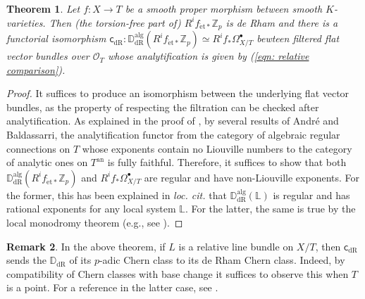 \documentclass[11pt, letterpaper]{amsart}
\theoremstyle{plain}
\newtheorem{theorem}{Theorem}[section]
\theoremstyle{definition}
\newtheorem{remark}[theorem]{Remark}
\newcommand{\ID}{\mathbb{D}}
\newcommand{\IL}{\mathbb{L}}
\newcommand{\IZ}{\mathbb{Z}}
\newcommand{\<}{\langle}
\renewcommand{\>}{\rangle}
\newcommand{\sO}{\mathcal{O}}
\newcommand{\et}{\mathrm{{\acute{e}}t}}
\newcommand{\dR}{\mathrm{dR}}
\begin{document}
\begin{theorem}
\label{thm: alg. compare}
    Let $f : X \to T$ be a smooth proper morphism between smooth $K$-varieties. Then (the torsion-free part of) $R^i f_{\et *} \IZ_p$ is de Rham and there is a functorial isomorphism $\mathsf{c}_\dR : \ID_\dR^{\mathrm{alg}}(R^i f_{\et *} \IZ_p) \simeq R^i f_* \Omega_{X/T}^\bullet$ bewteen filtered flat vector bundles over $\sO_T$ whose analytification is given by (\ref{eqn: relative comparison}).  
\end{theorem}
\begin{proof}
It suffices to produce an isomorphism between the underlying flat vector bundles, as the property of respecting the filtration can be checked after analytification. 
As explained in the proof of \cite[Lem.~4.1.2]{DLLZ}, by several results of Andr\'e and Baldassarri, the analytification functor from the category of algebraic regular connections on $T$ whose exponents contain no Liouville numbers to the category of analytic ones on $T^{\mathrm{an}}$ is fully faithful. Therefore, it suffices to show that both $\ID_\dR^{\mathrm{alg}}(R^i f_{\et *} \IZ_p)$ and $R^i f_* \Omega_{X/T}^\bullet$ are regular and have non-Liouville exponents. 
For the former, this has been explained in \textit{loc. cit.} that $\ID_\dR^{\mathrm{alg}}(\IL)$ is regular and has rational exponents for any local system $\IL$. 
For the latter, the same is true by the local monodromy theorem (e.g., see \cite[\S13]{Kat70}). 
\end{proof}



\begin{remark}
\label{rmk: Chern class}
    In the above theorem, if $L$ is a relative line bundle on $X/T$, then $\mathsf{c}_\dR$ sends the $\ID_\dR$ of its $p$-adic Chern class to its de Rham Chern class. 
    Indeed, by compatibility of Chern classes with base change it suffices
    to observe this when $T$ is a point. 
    For a reference in the latter case, see \cite[Prop.~11.2]{IIK}.
\end{remark}
\end{document}
